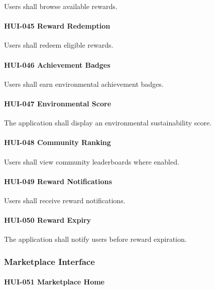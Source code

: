 Users shall browse available rewards.

\paragraph{HUI-045 Reward Redemption}

Users shall redeem eligible rewards.

\paragraph{HUI-046 Achievement Badges}

Users shall earn environmental achievement badges.

\paragraph{HUI-047 Environmental Score}

The application shall display an environmental sustainability score.

\paragraph{HUI-048 Community Ranking}

Users shall view community leaderboards where enabled.

\paragraph{HUI-049 Reward Notifications}

Users shall receive reward notifications.

\paragraph{HUI-050 Reward Expiry}

The application shall notify users before reward expiration.


\subsubsection*{Marketplace Interface}

\paragraph{HUI-051 Marketplace Home}

